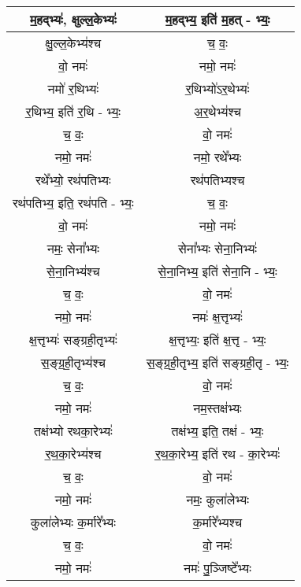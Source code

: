 {\begin{longtable}{|c|c|}
\hline
म॒हद्भ्यः॑, क्षुल्ल॒केभ्यः॑               & म॒हद्भ्य॒ इति॑ म॒हत् - भ्यः॒\\
\hline
क्षु॒ल्ल॒केभ्य॑श्च                     & च॒ वः॒\\
\hline
वो॒ नमः॑                        & नमो॒ नमः॑\\
\hline
नमो॑ र॒थिभ्यः॑                    & र॒थिभ्यो॑ऽर॒थेभ्यः॑\\
\hline
र॒थिभ्य॒ इति॑ र॒थि - भ्यः॒           & अ॒र॒थेभ्य॑श्च\\
\hline
च॒ वः॒                          & वो॒ नमः॑\\
\hline
नमो॒ नमः॑                       & नमो॒ रथे᳚भ्यः\\
\hline
रथे᳚भ्यो॒ रथ॑पतिभ्यः                & रथ॑पतिभ्यश्च\\
\hline
रथ॑पतिभ्य॒ इति॒ रथ॑पति - भ्यः॒       & च॒ वः॒\\
\hline
वो॒ नमः॑                        & नमो॒ नमः॑\\
\hline
नमः॒ सेना᳚भ्यः                    & सेना᳚भ्यः सेना॒निभ्यः॑\\
\hline
से॒ना॒निभ्य॑श्च                     & से॒ना॒निभ्य॒ इति॑ सेना॒नि - भ्यः॒\\
\hline
च॒ वः॒                          & वो॒ नमः॑\\
\hline
नमो॒ नमः॑                       & नमः॑ क्ष॒त्तृभ्यः॑\\
\hline
क्ष॒त्तृभ्यः॑ सङ्ग्रही॒तृभ्यः॑            & क्ष॒त्तृभ्यः॒ इति॑ क्ष॒त्तृ - भ्यः॒\\
\hline
स॒ङ्ग्र॒ही॒तृभ्य॑श्च                   & स॒ङ्ग्र॒ही॒तृभ्य॒ इति॑ सङ्ग्रही॒तृ - भ्यः॒\\
\hline
च॒ वः॒                          & वो॒ नमः॑\\
\hline
नमो॒ नमः॑                       & नम॒स्तक्ष॑भ्यः\\
\hline
तक्ष॑भ्यो रथका॒रेभ्यः॑               & तक्ष॑भ्य॒ इति॒ तक्ष॑ - भ्यः॒\\
\hline
र॒थ॒का॒रेभ्य॑श्च                     & र॒थ॒का॒रेभ्य॒ इति॑ रथ - का॒रेभ्यः॑\\
\hline
च॒ वः॒                          & वो॒ नमः॑\\
\hline
नमो॒ नमः॑                       & नमः॒ कुला॑लेभ्यः\\
\hline
कुला॑लेभ्यः क॒र्मारे᳚भ्यः              & क॒र्मारे᳚भ्यश्च\\
\hline
च॒ वः॒                          & वो॒ नमः॑\\
\hline
नमो॒ नमः॑                       & नमः॑ पु॒ञ्जिष्टे᳚भ्यः\\

\end{longtable}}
